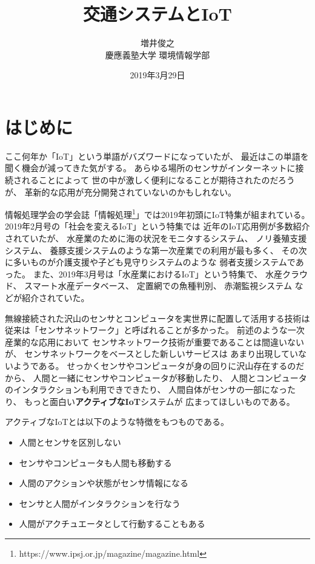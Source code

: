 \documentclass[twocolumn,10pt]{jarticle}
\title{交通システムとIoT}
\author{増井俊之 \\ 慶應義塾大学 環境情報学部}
\date{2019年3月29日}
\begin{document}
\maketitle

\thispagestyle{empty}


\section{はじめに}
  
ここ何年か「IoT」という単語がバズワードになっていたが、
最近はこの単語を聞く機会が減ってきた気がする。
あらゆる場所のセンサがインターネットに接続されることによって
世の中が激しく便利になることが期待されたのだろうが、
革新的な応用が充分開発されていないのかもしれない。

情報処理学会の学会誌「情報処理\footnote{
  \textsf{https://www.ipsj.or.jp/magazine/magazine.html}
}」では2019年初頭にIoT特集が組まれている。
2019年2月号の「社会を変えるIoT」という特集では
近年のIoT応用例が多数紹介されていたが、
水産業のために海の状況をモニタするシステム、
ノリ養殖支援システム、
養豚支援システムのような第一次産業での利用が最も多く、
その次に多いものが介護支援や子ども見守りシステムのような
弱者支援システムであった。
また、2019年3月号は「水産業におけるIoT」という特集で、
水産クラウド、
スマート水産データベース、
定置網での魚種判別、
赤潮監視システム
などが紹介されていた。

無線接続された沢山のセンサとコンピュータを実世界に配置して活用する技術は
従来は「センサネットワーク」と呼ばれることが多かった。
前述のような一次産業的な応用において
センサネットワーク技術が重要であることは間違いないが、
センサネットワークをベースとした新しいサービスは
あまり出現していないようである。
せっかくセンサやコンピュータが身の回りに沢山存在するのだから、
人間と一緒にセンサやコンピュータが移動したり、
人間とコンピュータのインタラクションも利用できできたり、
人間自体がセンサの一部になったり、
もっと面白い\textbf{アクティブなIoT}システムが
広まってほしいものである。

アクティブなIoTとは以下のような特徴をもつものである。

\begin{itemize}
  \setlength{\itemsep}{0cm} %
  \item 人間とセンサを区別しない
  \item センサやコンピュータも人間も移動する
  \item 人間のアクションや状態がセンサ情報になる
  \item センサと人間がインタラクションを行なう
  \item 人間がアクチュエータとして行動することもある
\end{itemize}
\end{document}
